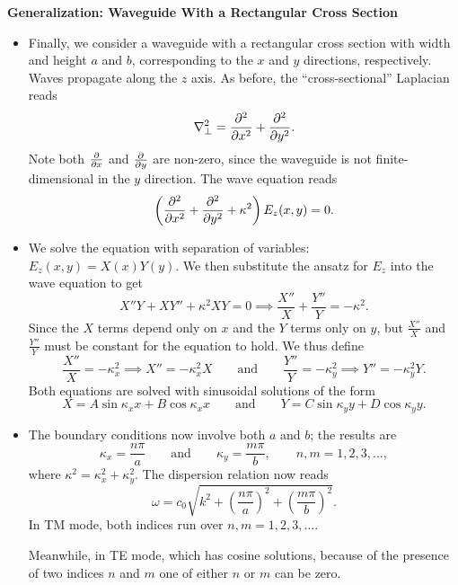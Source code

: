 \documentclass[11pt, a4paper]{article}
\newcommand{\eqtext}[1]{\qquad \text{#1} \qquad}
\renewcommand{\laplacian}{\nabla^{2}}
\begin{document}
\textbf{Generalization: Waveguide With a Rectangular Cross Section}
\begin{itemize}
	\item Finally, we consider a waveguide with a rectangular cross section with width and height $ a $ and $ b $, corresponding to the $ x $ and $ y $ directions, respectively. Waves propagate along the $ z $ axis. As before, the ``cross-sectional'' Laplacian reads
	\begin{equation*}
		\laplacian_{\perp} = \pdv[2]{}{x} + \pdv[2]{}{y}.
	\end{equation*}
	Note both $ \pdv{x} $ and $ \pdv{y} $ are non-zero, since the waveguide is not finite-dimensional in the $ y $ direction. The wave equation reads
	\begin{equation*}
		\left(\pdv[2]{}{x} + \pdv[2]{}{y} + \kappa^{2}\right)E_{z}(x, y) = 0.
	\end{equation*}
	
	\item We solve the equation with separation of variables: $ E_{z}(x, y) = X(x)Y(y) $. We then substitute the ansatz for $ E_{z} $ into the wave equation to get
	\begin{equation*}
		X''Y + XY'' + \kappa^{2}XY = 0 \implies \frac{X''}{X} + \frac{Y''}{Y} = - \kappa^{2}.
	\end{equation*}
	Since the $ X $ terms depend only on $ x $ and the $ Y $ terms only on $ y $, but $ \frac{X''}{X} $ and $ \frac{Y''}{Y} $ must be constant for the equation to hold. We thus define
	\begin{equation*}
		\frac{X''}{X} = - \kappa_{x}^{2} \implies 	X'' = - \kappa_{x}^{2}X \eqtext{and} \frac{Y''}{Y} = - \kappa_{y}^{2} \implies  Y'' = - \kappa_{y}^{2}Y .
	\end{equation*}
	Both equations are solved with sinusoidal solutions of the form
	\begin{equation*}
		X = A\sin \kappa_{x}x + B \cos \kappa_{x}x \eqtext{and} Y = C\sin \kappa_{y}y + D \cos \kappa_{y}y.
	\end{equation*}
	
	\item The boundary conditions now involve both $ a $ and $ b $; the results are
	\begin{equation*}
		\kappa_{x} = \frac{n\pi }{a}\eqtext{and} \kappa_{y} = \frac{m \pi}{b}, \qquad n, m = 1, 2, 3, \ldots,
	\end{equation*}
	where $ \kappa^{2} = \kappa_{x}^{2} + \kappa_{y}^{2} $. The dispersion relation now reads
	\begin{equation*}
		\omega = c_{0} \sqrt{k^{2} + \left(\frac{n\pi}{a}\right)^{2} +  \left(\frac{m\pi}{b}\right)^{2}}.
	\end{equation*}
	In TM mode, both indices run over $ n, m = 1, 2, 3, \ldots $. 
	
	Meanwhile, in TE mode, which has cosine solutions, because of the presence of two indices $ n $ and $ m $ one of either $ n $ or $ m $ can be zero.
	
\end{itemize}
\end{document}
